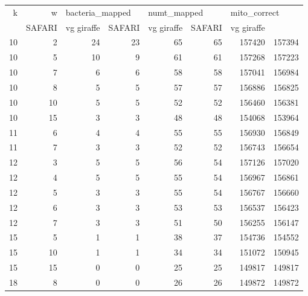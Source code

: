 \begin{tabular}{rrrrrrrr}
\toprule
 k &  w & \multicolumn{2}{l}{bacteria\_mapped} & \multicolumn{2}{l}{numt\_mapped} & \multicolumn{2}{l}{mito\_correct} \\
   &          SAFARI & vg giraffe &      SAFARI & vg giraffe &       SAFARI & vg giraffe \\
\midrule
10 &  2 &              24 &         23 &          65 &         65 &       157420 &     157394 \\
10 &  5 &              10 &          9 &          61 &         61 &       157268 &     157223 \\
10 &  7 &               6 &          6 &          58 &         58 &       157041 &     156984 \\
10 &  8 &               5 &          5 &          57 &         57 &       156886 &     156825 \\
10 & 10 &               5 &          5 &          52 &         52 &       156460 &     156381 \\
10 & 15 &               3 &          3 &          48 &         48 &       154068 &     153964 \\
11 &  6 &               4 &          4 &          55 &         55 &       156930 &     156849 \\
11 &  7 &               3 &          3 &          52 &         52 &       156743 &     156654 \\
12 &  3 &               5 &          5 &          56 &         54 &       157126 &     157020 \\
12 &  4 &               5 &          5 &          55 &         54 &       156967 &     156861 \\
12 &  5 &               3 &          3 &          55 &         54 &       156767 &     156660 \\
12 &  6 &               3 &          3 &          53 &         53 &       156537 &     156423 \\
12 &  7 &               3 &          3 &          51 &         50 &       156255 &     156147 \\
15 &  5 &               1 &          1 &          38 &         37 &       154736 &     154552 \\
15 & 10 &               1 &          1 &          34 &         34 &       151072 &     150945 \\
15 & 15 &               0 &          0 &          25 &         25 &       149817 &     149817 \\
18 &  8 &               0 &          0 &          26 &         26 &       149872 &     149872 \\

\end{tabular}
